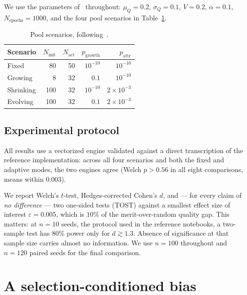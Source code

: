 \documentclass[10pt,twocolumn]{article}
\begin{document}
We use the parameters of~\cite{kruijssen2024} throughout: $\mu_Q=0.2$,
$\sigma_Q=0.1$, $V=0.2$, $\alpha=0.1$, $N_{\mathrm{epochs}}=1000$, and the four pool
scenarios in Table~\ref{tab:scenarios}.

\begin{table}[t]\centering\small
\caption{Pool scenarios, following~\cite{kruijssen2024}.}
\label{tab:scenarios}
\begin{tabular}{lrrrr}
\toprule
Scenario & $N_{\mathrm{init}}$ & $N_{\mathrm{act}}$ & $p_{\mathrm{growth}}$ & $p_{\mathrm{attr}}$\\
\midrule
Fixed     & 80  & 50 & $10^{-10}$ & $10^{-10}$\\
Growing   & 8   & 32 & $0.1$      & $10^{-10}$\\
Shrinking & 100 & 32 & $10^{-10}$ & $2\times10^{-3}$\\
Evolving  & 100 & 32 & $0.1$      & $2\times10^{-3}$\\
\bottomrule
\end{tabular}
\end{table}

\subsection{Experimental protocol}
All results use a vectorized engine validated against a direct transcription of the
reference implementation: across all four scenarios and both the fixed and adaptive
modes, the two engines agree (Welch $p>0.56$ in all eight comparisons, means within
$0.003$).

We report Welch's $t$-test, Hedges-corrected Cohen's $d$, and --- for every claim of
\emph{no difference} --- two one-sided tests (TOST) against a smallest effect size of
interest $\varepsilon=0.005$, which is $10\%$ of the merit-over-random quality gap.
This matters: at $n=10$ seeds, the protocol used in the reference notebooks, a
two-sample test has $80\%$ power only for $d\gtrsim1.3$. Absence of significance at
that sample size carries almost no information. We use $n=100$ throughout and $n=120$
paired seeds for the final comparison.

\section{A selection-conditioned bias}
\label{sec:bias}
\end{document}
